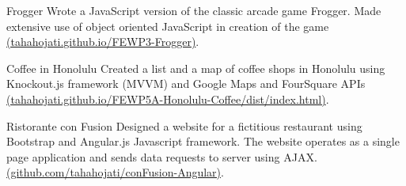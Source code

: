 \begin{cventries}
  \cventry
    {Frogger
    }
    {}
    {}
    {}
    {Wrote a JavaScript version of the classic arcade game Frogger. Made extensive use of object oriented JavaScript in creation of the game
    	\href{http://tahahojati.github.io/FEWP3-Frogger}{(tahahojati.github.io/FEWP3-Frogger)}.
    }
    
  \cventry
  {Coffee in Honolulu
  }
  {}
  {}
  {}
  {Created a list and a map of coffee shops in Honolulu using Knockout.js framework (MVVM) and Google Maps and FourSquare APIs
  	\href{https://tahahojati.github.io/FEWP5A-Honolulu-Coffee/dist/index.html}{(tahahojati.github.io/FEWP5A-Honolulu-Coffee/dist/index.html)}.
  }
 
  \cventry
    {Ristorante con Fusion
    }
    {}
    {}
    {}
    {Designed a website for a fictitious restaurant using Bootstrap and Angular.js Javascript framework.  The website operates as a single page application and sends data requests to server using AJAX.  \href{https://github.com/tahahojati/conFusion-Angular}{(github.com/tahahojati/conFusion-Angular)}.
    }       
    
\end{cventries}

